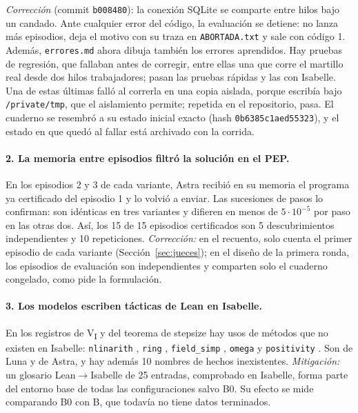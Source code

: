 \documentclass[11pt]{article}
\theoremstyle{remark}
\begin{document}
\emph{Corrección} (commit \texttt{b008480}): la conexión SQLite se comparte entre hilos bajo un candado. Ante cualquier error del código, la evaluación se detiene: no lanza más episodios, deja el motivo con su traza en \texttt{ABORTADA.txt} y sale con código 1. Además, \texttt{errores.md} ahora dibuja también los errores aprendidos. Hay pruebas de regresión, que fallaban antes de corregir, entre ellas una que corre el martillo real desde dos hilos trabajadores; pasan las \PruebasRapidasNueve{} pruebas rápidas y las \PruebasIsabelleNueve{} con Isabelle. Una de estas últimas falló al correrla en una copia aislada, porque escribía bajo \texttt{/private/tmp}, que el aislamiento permite; repetida en el repositorio, pasa. El cuaderno se resembró a su estado inicial exacto (hash \texttt{0b6385c1aed55323}), y el estado en que quedó al fallar está archivado con la corrida.

\paragraph{2. La memoria entre episodios filtró la solución en el PEP.} En los episodios 2 y 3 de cada variante, Astra recibió en su memoria el programa ya certificado del episodio 1 y lo volvió a enviar. Las sucesiones de pasos lo confirman: son idénticas en tres variantes y difieren en menos de $5\cdot10^{-5}$ por paso en las otras dos. Así, los 15 de 15 episodios certificados son 5 descubrimientos independientes y 10 repeticiones. \emph{Corrección:} en el recuento, solo cuenta el primer episodio de cada variante (Sección~\ref{sec:jueces}); en el diseño de la primera ronda, los episodios de evaluación son independientes y comparten solo el cuaderno congelado, como pide la formulación.

\paragraph{3. Los modelos escriben tácticas de Lean en Isabelle.} En los registros de V\textsubscript{I} y del teorema de stepsize hay \LeanTotal{} usos de métodos que no existen en Isabelle: \texttt{nlinarith} \Leannlinarith, \texttt{ring} \Leanring, \texttt{field\_simp} \Leanfieldsimp, \texttt{omega} \Leanomega{} y \texttt{positivity} \Leanpositivity. Son \LeanLuna{} de Luna y \LeanAstra{} de Astra, y hay además 10 nombres de hechos inexistentes. \emph{Mitigación:} un glosario Lean$\to$Isabelle de 25 entradas, comprobado en Isabelle, forma parte del entorno base de todas las configuraciones salvo B0. Su efecto se mide comparando B0 con B, que todavía no tiene datos terminados.
\end{document}
